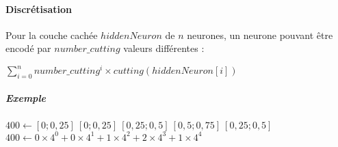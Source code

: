 \paragraph{Discrétisation} Pour la couche cachée $hiddenNeuron$ de $n$ neurones, un neurone
      pouvant être encodé par $number\_cutting$ valeurs différentes :
      \begin{center}
	$\sum \limits_{i=0}^{n} number\_cutting^{i} \times cutting(hiddenNeuron[i]) $
      \end{center}
      \subparagraph{Exemple}
	$400 \gets [0 ; 0,25 ]\ [0 ; 0,25 ]\  [0,25 ; 0,5 ]\  [0,5 ; 0,75 ]\  [0,25 ; 0,5 ]$ \\
	\hspace*{2.70cm}
	$400 \gets 0\times4^0 +   0\times4^1  +   1\times4^2   +  2\times4^3   +   1 \times4^4$